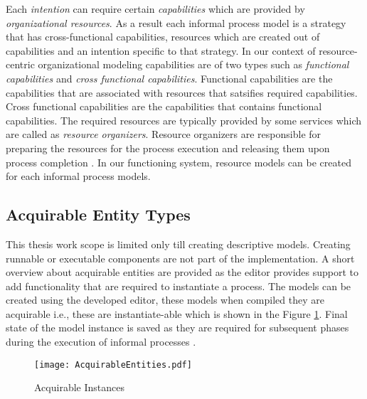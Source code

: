 Each \textit{intention} can require certain \textit{capabilities} which are provided by \textit{organizational resources}. 
As a result each informal process model is a strategy that has cross-functional capabilities, resources which are created out of capabilities and an intention specific to that strategy. In our context of resource-centric organizational modeling capabilities are of two types such as \textit{functional capabilities} and \textit{cross functional capabilities}. Functional capabilities are the capabilities that are associated with resources that satsifies required capabilities. Cross functional capabilities are the capabilities that contains functional capabilities. The required resources are typically provided by some services which are called as \textit{resource organizers}. Resource organizers are responsible for preparing the resources for the process execution and releasing them upon process completion \cite{Sungur2014a}. In our functioning system, resource models can be created for each informal process models. 

\subsection{Acquirable Entity Types}
\label{sec:acquirableentities}
This thesis work scope is limited only till creating descriptive models. Creating runnable or executable components are not part of the implementation. A short overview about acquirable entities are provided as the editor provides support to add functionality that are required to instantiate a process. The models can be created using the developed editor, these models when compiled they are acquirable i.e., these are instantiate-able which is shown in the Figure \ref{fig:acquirableentities}. Final state of the model instance is saved as they are required for subsequent phases during the execution of informal processes \cite{Sungur2015}. 

\begin{figure}
	\centering
	\texttt{[image: AcquirableEntities.pdf]}
	\caption{Acquirable Instances}
	\label{fig:acquirableentities}
\end{figure}

